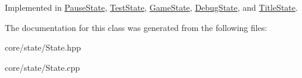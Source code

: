 \-Implemented in \hyperlink{classPauseState_a9d6e9c6d96e140487badbe1da2738fa3_a9d6e9c6d96e140487badbe1da2738fa3}{\-Pause\-State}, \hyperlink{classTestState_affddb89d007d492d4317dbfd1a920b96_affddb89d007d492d4317dbfd1a920b96}{\-Test\-State}, \hyperlink{classGameState_a4ac988f0da5c33b43ff356890fcf9c1c_a4ac988f0da5c33b43ff356890fcf9c1c}{\-Game\-State}, \hyperlink{classDebugState_a6f49614c9b947cedcad131c28e24f885_a6f49614c9b947cedcad131c28e24f885}{\-Debug\-State}, and \hyperlink{classTitleState_aa282ac0c6e22267cb6a7054973d75fdf_aa282ac0c6e22267cb6a7054973d75fdf}{\-Title\-State}.



\-The documentation for this class was generated from the following files\-:\begin{DoxyCompactItemize}
\item 
core/state/\-State.\-hpp\item 
core/state/\-State.\-cpp\end{DoxyCompactItemize}
